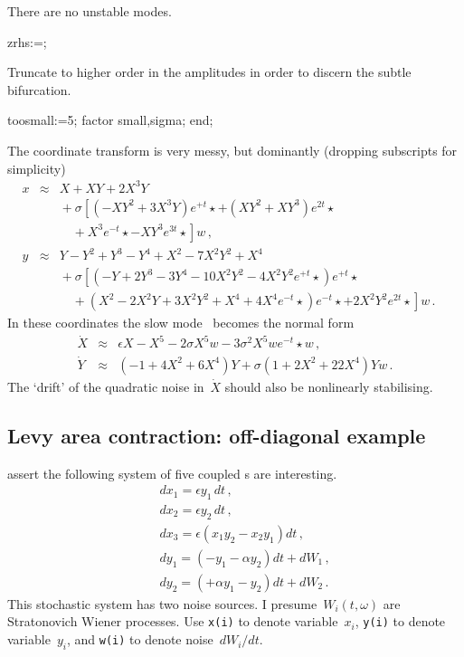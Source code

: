 \documentclass[11pt,a5paper]{article}
\newcommand{\Z}[1]{e^{#1t}{\star}}
\begin{document}
There are no unstable modes. 
\begin{reduce}
zrhs:={};
\end{reduce}

Truncate to higher order in the amplitudes in order to discern the subtle bifurcation.
\begin{reduce}
toosmall:=5;
factor small,sigma;
end;
\end{reduce}

The coordinate transform is very messy, but dominantly (dropping subscripts for simplicity)
\begin{eqnarray}
x&\approx&X
+XY +2X^3Y 
\nonumber\\&&{}
+\sigma\left[ (-XY^2+3X^3Y)\Z+ +(XY^2+XY^3)\Z2 
\right.\nonumber\\&&\quad\left.{}
+X^3\Z--XY^3\Z3 \right]w
\,,\\
y&\approx&
Y-Y^2+Y^3-Y^4+X^2-7X^2Y^2+X^4
\nonumber\\&&{}
+\sigma\left[ (-Y+2Y^3-3Y^4-10X^2Y^2 -4X^2Y^2\Z+)\Z+ 
\right.\nonumber\\&&\quad\left.{}
+(X^2-2X^2Y+3X^2Y^2+X^4 +4X^4\Z-)\Z- 
+2X^2Y^2\Z2 \right]w\,.\quad{}
\end{eqnarray}
In these coordinates the slow mode \sde\ becomes the normal form
\begin{eqnarray}
\dot X &\approx& \epsilon X-X^5-2\sigma X^5 w -3\sigma^2 X^5 w\Z-w 
\,,\\
\dot Y&\approx& (-1+4X^2+6X^4)Y
+\sigma(1+2X^2+22X^4)Yw \,.
\end{eqnarray}
The `drift' of the quadratic noise in~$\dot X$ should also be nonlinearly stabilising.


\subsection{Levy area contraction: off-diagonal example}

\cite{Pavliotis07} assert the following system of five coupled \sde{}s are interesting.
\begin{eqnarray}&&
dx_1=\epsilon y_1\,dt \,,\\&&
dx_2=\epsilon y_2\,dt \,,\\&&
dx_3=\epsilon (x_1y_2-x_2y_1)dt \,,\\&&
dy_1=(-y_1-\alpha y_2)dt +dW_1 \,,\\&& 
dy_2=(+\alpha y_1-y_2)dt +dW_2 \,.
\end{eqnarray}
This stochastic system has two noise sources.
I presume~$W_i(t,\omega)$ are Stratonovich Wiener processes.
Use \verb|x(i)| to denote variable~$x_i$, \verb|y(i)| to denote variable~$y_i$, and \verb|w(i)| to denote noise~$dW_i/dt$.
\end{document}
